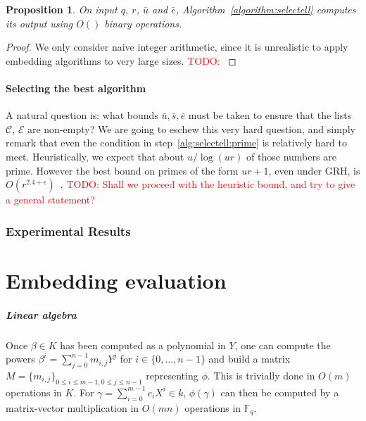 \documentclass[12pt]{article}
\theoremstyle{plain}
\newtheorem{proposition}[theorem]{Proposition}
\theoremstyle{definition}
\newcommand{\todo}[1]{\textcolor{red}{TODO: #1}}
\def\F{\ensuremath{\mathbb{F}}}
\newcounter{algorithm}
\begin{document}
\begin{proposition}
  On input $q$, $r$, $\bar{u}$ and $\bar{e}$,
  Algorithm~\ref{algorithm:selectell} computes its output using $O()$
  binary operations.
\end{proposition}
\begin{proof}
  We only consider naive integer arithmetic, since it is unrealistic
  to apply embedding algorithms to very large sizes. \todo{}
\end{proof}

\subsection{Selecting the best algorithm}

A natural question is: what bounds $\bar{u},\bar{s},\bar{e}$ must be
taken to ensure that the lists $\mathcal{C}$, $\mathcal{E}$ are
non-empty? We are going to eschew this very hard question, and simply
remark that even the condition in step~\ref{alg:selectell:prime} is
relatively hard to meet. Heuristically, we expect that about
$u/\log(ur)$ of those numbers are prime. However the best bound on
primes of the form $ur+1$, even under GRH, is
$O(r^{2.4+\epsilon})$~\cite{heath1992zero}. \todo{Shall we proceed
  with the heuristic bound, and try to give a general statement?}



\section{Experimental Results}


\part{Embedding evaluation}
\label{part:eval}


\subsubsection{Linear algebra}

Once $\beta \in K$ has been computed as a polynomial in $Y$,
one can compute the powers
$\beta^i = \sum_{j=0}^{n-1} m_{i,j} Y^j$
for $i \in \{0, \ldots, n-1\}$ and build a matrix
$M = \{m_{i, j}\}_{0\leq i \leq m-1, 0 \leq j \leq n -1}$
representing $\phi$.
This is trivially done in $O(m)$ operations in $K$.
For $\gamma = \sum_{i = 0}^{m - 1} c_i X^i \in k$,
$\phi(\gamma)$ can then be computed by a
matrix-vector multiplication in $O(m n)$ operations in $\F_q$.
\end{document}
